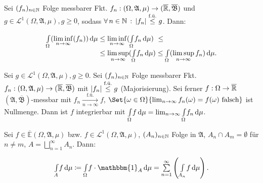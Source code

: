 \documentclass{cheat-sheet}
\newcommand{\Alg}{\mathfrak{A}} %
\newcommand{\Bor}{\mathfrak{B}} %
\newcommand{\E}{\mathbb{E}} %
\newcommand{\Leb}{\mathcal{L}} %
\newcommand{\ind}{\mathbbm{1}} %
\theoremstyle{definition}
\newcommand{\IntOmu}[1]{\Int{\Omega}{}{#1}{\mu}} %
\begin{document}

\vspace{-20pt}

\begin{satz}
  \begin{doublespace}
    Sei $(f_n)_{n \in \mathbb{N}}$ Folge messbarer Fkt. $f_n : (\Omega, \Alg, \mu) \to (\ER, \overline{\Bor})$ und $g \in \Leb^1(\Omega, \Alg, \mu), g \geq 0$, sodass $\forall \, {n \in \mathbb{N}} \,:\, \lvert f_n\rvert \overset{\text{f.ü.}}\leq g$. Dann:\\[-16pt]
  \end{doublespace}
  \begin{align*}
    \IntOmu{(\liminf_{n \to \infty} (f_n))}
    &\leq \liminf_{n \to \infty} (\IntOmu{f_n}) \,\,\leq\\[-5pt]
    &\leq \limsup_{n \to \infty} (\IntOmu{f_n})
    \leq \IntOmu{(\limsup_{n \to \infty} f_n)}.
  \end{align*}
\end{satz}

\begin{satz}\begin{doublespace}
  Sei $g \in \Leb^1(\Omega, \Alg, \mu), g \geq 0$. Sei $(f_n)_{n \in \mathbb{N}}$ Folge messbarer Fkt. $f_n : (\Omega, \Alg, \mu) \to (\ER, \overline{\Bor})$ mit $\lvert f_n\rvert \overset{\text{f.ü.}}\leq g$ (Majorisierung).
  Sei ferner $f : \Omega \to \overline{\mathbb{R}}$ $(\Alg, \overline{\Bor})$-messbar mit $f_n \xrightarrow[n \to \infty]{\text{f.ü.}} f$, \dh{} $\Set{ \omega \in \Omega }{ \lim_{n \to \infty} f_n(\omega) = f(\omega) \text{ falsch} }$ ist Nullmenge. Dann ist $f$ integrierbar mit $\IntOmu{f} = \lim_{n \to \infty} \IntOmu{f_n}$.
\end{doublespace}\end{satz}

\vspace{-20pt}

\begin{satz}
  \begin{doublespace}
    Sei $f \in \overline{\E}(\Omega, \Alg, \mu)$ bzw. $f \in \Leb^1(\Omega, \Alg, \mu)$, $(A_n)_{n \in \mathbb{N}}$ Folge in $\Alg$, $A_n \cap A_m = \emptyset$ für $n \not= m$, $A = \bigsqcup_{n=1}^\infty A_n$. Dann:\\[-10pt]
  \end{doublespace}
  \[ \Int{A}{}{f}{\mu} \coloneqq \IntOmu{f \cdot \ind_A} = \sum_{n=1}^\infty \left( \Int{A_n}{}{f}{\mu} \right). \]
\end{satz}
\end{document}
